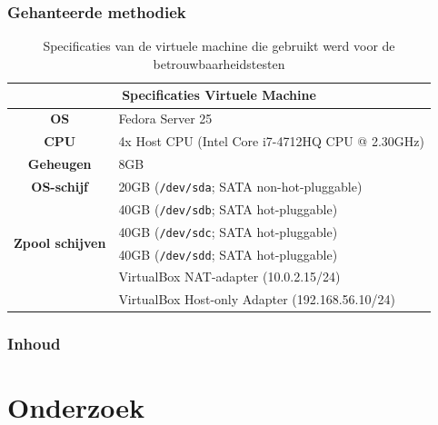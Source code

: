 \documentclass{beamer}
\begin{document}
\begin{frame}
  \frametitle{Gehanteerde methodiek}
  \begin{table}[h]
    \centering
    \begin{tabular}{c l}
      \toprule
      \multicolumn{2}{c}{\textbf{Specificaties Virtuele Machine}} \\
      \hline
      \textbf{OS} & Fedora Server 25 \\
      \hline
      \textbf{CPU} & 4x Host CPU (Intel Core i7-4712HQ CPU @ 2.30GHz) \\
      \hline
      \textbf{Geheugen} & 8GB \\
      \hline
      \textbf{OS-schijf} & 20GB (\texttt{/dev/sda}; SATA non-hot-pluggable) \\
      \hline
      \multirow{4}{*}{\textbf{Zpool schijven}} & 40GB (\texttt{/dev/sdb}; SATA hot-pluggable) \\
        & 40GB (\texttt{/dev/sdc}; SATA hot-pluggable) \\
        & 40GB (\texttt{/dev/sdd}; SATA hot-pluggable) \\
      \hline
      \multirow{2}{*}{\textbf{NIC's}} & VirtualBox NAT-adapter (10.0.2.15/24) \\
        & VirtualBox Host-only Adapter (192.168.56.10/24) \\
      \bottomrule
    \end{tabular}
    \caption{Specificaties van de virtuele machine die gebruikt werd voor de betrouwbaarheidstesten}
    \label{tab:specs_vm}
  \end{table}
\end{frame}

\begin{frame}
  \frametitle{Inhoud} %
  \tableofcontents %
\end{frame}

\section{Onderzoek}
\end{document}
